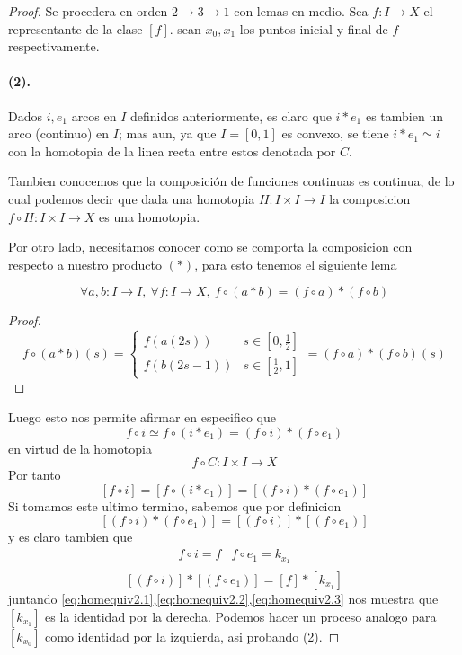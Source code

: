 \begin{proof}
Se procedera en orden \(2 \to 3 \to 1\) con lemas en medio. Sea \(f : I
\to X\) el representante de la clase \([f]\). sean \(x_0, x_1\) los
puntos inicial y final de \(f\) respectivamente.

\paragraph{(2).} Dados \(i,e_1\) arcos en \(I\) definidos anteriormente,
es claro que \(i * e_1\) es tambien un arco (continuo) en \(I\); mas aun,
ya que \(I = [0,1]\) es convexo, se tiene \(i * e_1 \simeq i\) con la
homotopia de la linea recta entre estos denotada por \(C\).

Tambien conocemos que la composición de funciones continuas es
continua, de lo cual podemos decir que dada una homotopia \(H : I \times
I \to I\) la composicion \( f \circ H : I \times I \to X\) es una homotopia.

Por otro lado, necesitamos conocer como se comporta la composicion con
respecto a nuestro producto \((*)\), para esto tenemos el siguiente lema
\begin{lema}
\label{lema:dist-composicion-producto}
\[\forall a,b : I \to I,\ \forall f : I \to X,\ f \circ (a * b) = (f
\circ a) * (f \circ b) \]
\end{lema}
\begin{proof}
  \[ f \circ (a*b) (s) =
    \begin{cases}
      f (a(2s)) & s \in [0,\frac{1}{2}] \\
      f (b(2s - 1)) & s \in [\frac{1}{2} , 1]
    \end{cases}
    = (f \circ a) * (f \circ b) (s)
  \]
\end{proof}

Luego esto nos permite afirmar en especifico que
\[ f \circ i \simeq f \circ (i * e_1) = (f \circ i) * (f \circ e_1) \]
en virtud de la homotopia
\[ f \circ C : I \times I \to X \]
Por tanto
\begin{equation}\label{eq:homequiv2.1}
[f \circ i] = [f \circ (i * e_1)] = [(f \circ i) * (f \circ e_1)]
\end{equation}
Si tomamos este ultimo termino, sabemos que por definicion
\begin{equation}\label{eq:homequiv2.2}
[(f \circ i) * (f \circ e_1)] = [(f \circ i)] * [(f \circ e_1)]
\end{equation}
y es claro tambien que
\[
  \begin{matrix}
    f \circ i = f & f \circ e_1 = k_{x_1} \\
  \end{matrix}
\]
\begin{equation}\label{eq:homequiv2.3}
[(f \circ i)] * [(f \circ e_1)] = [f] * [k_{x_1}]
\end{equation}
juntando
\eqref{eq:homequiv2.1},\eqref{eq:homequiv2.2},\eqref{eq:homequiv2.3} nos
muestra que \([k_{x_1}]\) es la identidad por la derecha. Podemos
hacer un proceso analogo para \([k_{x_0}]\) como identidad por la
izquierda, asi probando (2).


\end{proof}
